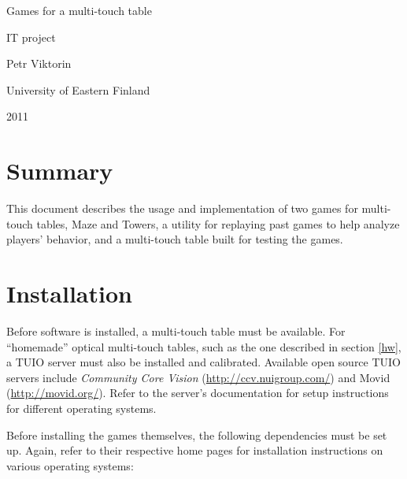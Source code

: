 \documentclass[a4paper,11pt]{article}
\begin{document}
\vspace*{3cm}

\begin{center}
{
    \huge Games for a multi-touch table

    \vspace{0.5em}

    \large IT project
}

\vspace{3em}

Petr Viktorin

University of Eastern Finland

2011
\end{center}

\vspace*{2.718\fill}

\newpage

\tableofcontents

\newpage

\section{Summary}

This document describes the usage and implementation of two games for
multi-touch tables, Maze and Towers, a utility for replaying past games to
help analyze players' behavior, and a multi-touch table built for testing the
games.



\section{Installation}

Before software is installed, a multi-touch table must be available.
For “homemade” optical multi-touch tables, such as the one described in
section \ref{hw}, a TUIO server must also be installed and calibrated.
Available open source TUIO servers include \emph{Community Core Vision}
(\url{http://ccv.nuigroup.com/}) and
Movid (\url{http://movid.org/}).
Refer to the server's documentation for setup instructions for different
operating systems.

Before installing the games themselves, the following dependencies must be
set up.
Again, refer to their respective home pages for installation instructions
on various operating systems:
\end{document}
